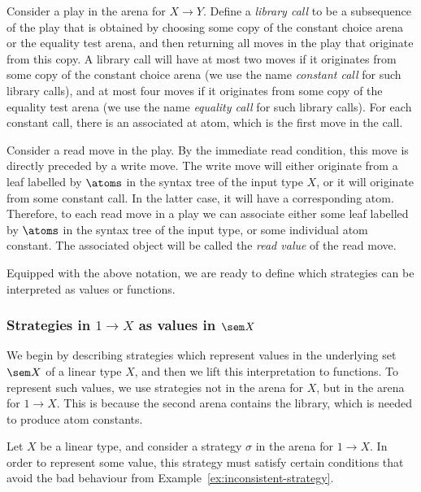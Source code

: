 Consider a play in the arena for $X \to Y$. Define a \emph{library call} to be a subsequence of the play that is obtained by choosing some copy of the constant choice arena or the equality test arena, and then returning all moves in the play that originate from this copy. A library call will have at most two moves if it originates from some copy of the constant choice arena (we use the name \emph{constant call} for such library calls), and at most four moves if it originates from some copy of the equality test arena (we use the name \emph{equality call} for such library calls). For each constant call, there is an associated at atom, which is the first move in the call. 

Consider a read move in the play. By the immediate read condition, this move is directly preceded by a write move. The write move will either originate from a leaf labelled by $\atoms$ in  the syntax tree of the input type $X$, or it will originate from some constant call. In the latter case, it will have a corresponding atom. Therefore, to each read move in a play we can associate either some leaf labelled by $\atoms$ in the syntax tree of the input type, or some individual atom constant. The associated object will be called the \emph{read value} of the read move.

Equipped with the above notation, we are ready to define which strategies  can  be interpreted as values or functions.

\subsubsection{Strategies in $1 \to X$ as values in $\sem X$}
\label{sec:strategies-in-1-to-x-as-elements-of-sem-x}
  We begin by describing strategies which represent values in the underlying set $\sem X$ of a linear type $X$, and then we lift this interpretation to functions.  To represent such values, we  use strategies not in the arena for $X$, but in the arena for $1 \to X$. This is because the second arena contains the library, which is needed to  produce  atom constants.

  Let $X$ be a linear type, and consider a strategy $\sigma$ in the arena for $1 \to X$. 
  In order to represent some value, this strategy must satisfy certain conditions that avoid the bad behaviour  from Example~\ref{ex:inconsistent-strategy}.   
  


